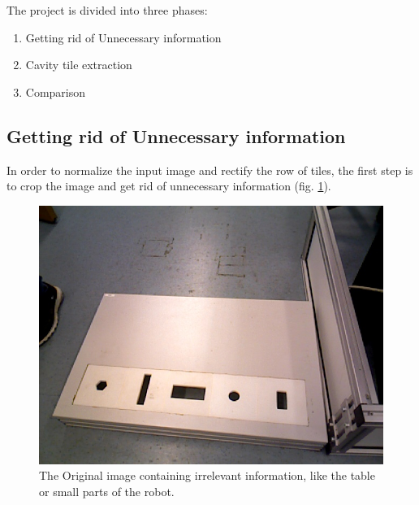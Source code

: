 \documentclass{article}
\begin{document}
The project is divided into three phases: 
\begin{enumerate}
\item Getting rid of Unnecessary information
\item Cavity tile extraction
\item Comparison
\end{enumerate}

\subsection{Getting rid of Unnecessary information}

In order to normalize the input image and rectify the row of tiles, the first step is to crop the image and get rid of unnecessary information (fig. \ref{fig:original}). \\
\begin{figure}[h!]
\centering
\includegraphics[scale=0.3]{images/frame06.jpg}
\caption{The Original image containing irrelevant information, like the table or small parts of the robot.}
\label{fig:original}
\end{figure}
\end{document}
